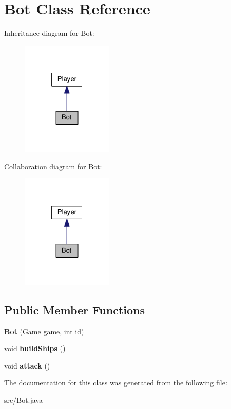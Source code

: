 \hypertarget{classBot}{}\section{Bot Class Reference}
\label{classBot}


Inheritance diagram for Bot\+:
\nopagebreak
\begin{figure}[H]
\begin{center}
\leavevmode
\includegraphics[width=124pt]{classBot__inherit__graph}
\end{center}
\end{figure}


Collaboration diagram for Bot\+:
\nopagebreak
\begin{figure}[H]
\begin{center}
\leavevmode
\includegraphics[width=124pt]{classBot__coll__graph}
\end{center}
\end{figure}
\subsection*{Public Member Functions}
\begin{DoxyCompactItemize}
\item 
{\bfseries Bot} (\hyperlink{classGame}{Game} game, int id)\hypertarget{classBot_a3e856f881d832774e0a607435ca3793e}{}\label{classBot_a3e856f881d832774e0a607435ca3793e}

\item 
void {\bfseries build\+Ships} ()\hypertarget{classBot_a1f860395e5334c64f8cb50edb6cbca1f}{}\label{classBot_a1f860395e5334c64f8cb50edb6cbca1f}

\item 
void {\bfseries attack} ()\hypertarget{classBot_a259001d8480a450678ee85d570a9f206}{}\label{classBot_a259001d8480a450678ee85d570a9f206}

\end{DoxyCompactItemize}


The documentation for this class was generated from the following file\+:\begin{DoxyCompactItemize}
\item 
src/Bot.\+java\end{DoxyCompactItemize}
